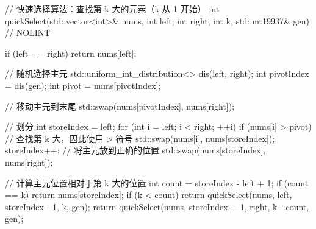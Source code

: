 \begin{cppcode}
// 快速选择算法：查找第 k 大的元素（k 从 1 开始）
int quickSelect(std::vector<int>& nums, int left, int right, int k, std::mt19937& gen) // NOLINT
{
    if (left == right) {
        return nums[left];
    }

    // 随机选择主元
    std::uniform_int_distribution<> dis(left, right);
    int pivotIndex = dis(gen);
    int pivot = nums[pivotIndex];

    // 移动主元到末尾
    std::swap(nums[pivotIndex], nums[right]);

    // 划分
    int storeIndex = left;
    for (int i = left; i < right; ++i) {
        if (nums[i] > pivot) { // 查找第 k 大，因此使用 > 符号
            std::swap(nums[i], nums[storeIndex]);
            storeIndex++;
        }
    }
    // 将主元放到正确的位置
    std::swap(nums[storeIndex], nums[right]);

    // 计算主元位置相对于第 k 大的位置
    int count = storeIndex - left + 1;
    if (count == k) {
        return nums[storeIndex];
    }
    if (k < count) {
        return quickSelect(nums, left, storeIndex - 1, k, gen);
    }
    return quickSelect(nums, storeIndex + 1, right, k - count, gen);
}
\end{cppcode}

